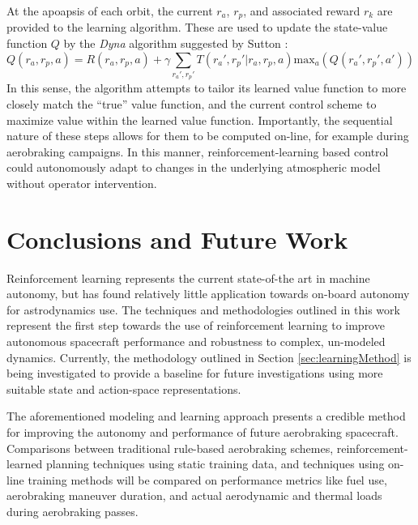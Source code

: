 \documentclass[paper,11pt]{AAS}		%
\begin{document}
At the apoapsis of each orbit, the current $r_a$, $r_p$, and associated reward $r_k$ are provided to the learning algorithm. These are used to update the state-value function $Q$ by the \textit{Dyna} algorithm suggested by Sutton \cite{Sutton2012}:
\begin{equation}
Q(r_{a}, r_{p}, a) = R(r_{a}, r_{p}, a) + \gamma \sum_{r_a', r_p'} T(r_a', r_p' | r_a, r_p, a)\text{max}_a(Q(r_a', r_p', a'))
\end{equation}
In this sense, the algorithm attempts to tailor its learned value function to more closely match the ``true'' value function, and the  current control scheme to maximize value within the learned value function. Importantly, the sequential nature of these steps allows for them to be computed on-line, for example during aerobraking campaigns. In this manner, reinforcement-learning based control could autonomously adapt to changes in the underlying atmospheric model without operator intervention.

\section{Conclusions and Future Work}

Reinforcement learning represents the current state-of-the art in machine autonomy, but has found relatively little application towards on-board autonomy for astrodynamics use. The techniques and methodologies outlined in this work represent the first step towards the use of reinforcement learning to improve autonomous spacecraft performance and robustness to complex, un-modeled dynamics. Currently, the methodology outlined in Section \ref{sec:learningMethod} is being investigated to provide a baseline for future investigations using more suitable state and action-space representations. 

The aforementioned modeling and learning approach presents a credible method for improving the autonomy and performance of future aerobraking spacecraft. Comparisons between traditional rule-based aerobraking schemes, reinforcement-learned planning techniques using static training data, and techniques using on-line training methods will be compared on performance metrics like fuel use, aerobraking maneuver duration, and actual aerodynamic and thermal loads during aerobraking passes.

\end{document}
